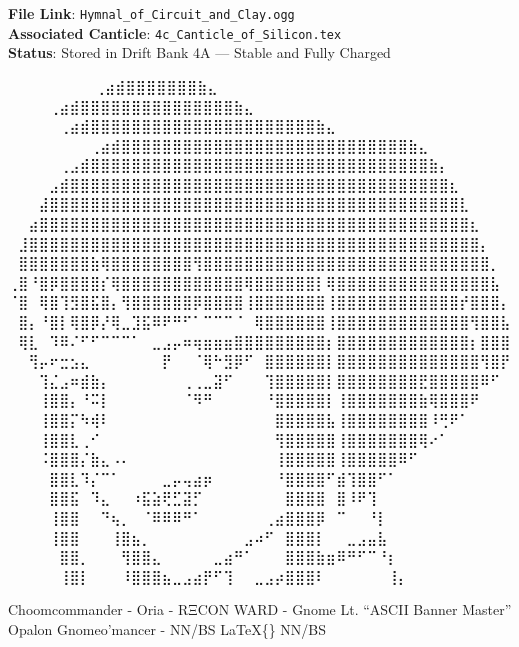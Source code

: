 \documentclass[
]{article}
\begin{document}
\textbf{File Link}: \texttt{Hymnal\_of\_Circuit\_and\_Clay.ogg}\\
\textbf{Associated Canticle}: \texttt{4c\_Canticle\_of\_Silicon.tex}\\
\textbf{Status}: Stored in Drift Bank 4A --- Stable and Fully Charged

⠀⠀⠀⠀⠀⠀ ⠀⠀⢀⣴⣾⣿⣿⣿⣿⣿⣿⣿⣷⣄⠀⠀⠀⠀⠀⠀⠀⠀ ⠀⠀⠀ ⠀ ⠀⠀⠀⠀⢀⣴⣾⣿⣿⣿⣿⣿⣿⣿⣿⣿⣿⣿⣿⣿⣿⣿⣷⣄⠀⠀⠀⠀⠀⠀⠀⠀ ⠀⠀
⠀ ⠀⠀⠀⠀⠀⢀⣴⣾⣿⣿⣿⣿⣿⣿⣿⣿⣿⣿⣿⣿⣿⣿⣿⣿⣿⣿⣿⣿⣿⣿⣷⣄⠀⠀⠀⠀⠀⠀⠀⠀
⠀⠀⠀⠀⠀⠀⠀⠀⢀⣴⣾⣿⣿⣿⣿⣿⣿⣿⣿⣿⣿⣿⣿⣿⣿⣿⣿⣿⣿⣿⣿⣿⣿⣿⣿⣿⣿⣿⣿⣷⣄⠀⠀⠀⠀⠀⠀⠀⠀
⠀⠀⠀⠀⠀⢀⣠⣾⣿⣿⣿⣿⣿⣿⣿⣿⣿⣿⣿⣿⣿⣿⣿⣿⣿⣿⣿⣿⣿⣿⣿⣿⣿⣿⣿⣿⣿⣿⣿⣿⣿⣷⡄⠀⠀⠀⠀⠀⠀
⠀⠀⠀⠀⣠⣾⣿⣿⣿⣿⣿⣿⣿⣿⣿⣿⣿⣿⣿⣿⣿⣿⣿⣿⣿⣿⣿⣿⣿⣿⣿⣿⣿⣿⣿⣿⣿⣿⣿⣿⣿⣿⣿⣆⠀⠀⠀⠀⠀
⠀⠀⠀⣼⣿⣿⣿⣿⣿⣿⣿⣿⣿⣿⣿⣿⣿⣿⣿⣿⣿⣿⣿⣿⣿⣿⣿⣿⣿⣿⣿⣿⣿⣿⣿⣿⣿⣿⣿⣿⣿⣿⣿⣿⣇⠀⠀⠀⠀
⠀⠀⣴⣿⣿⣿⣿⣿⣿⣿⣿⣿⣿⣿⣿⣿⣿⣿⣿⣿⣿⣿⣿⣿⣿⣿⣿⣿⣿⣿⣿⣿⣿⣿⣿⣿⣿⣿⣿⣿⣿⣿⣿⣿⣿⣆⠀⠀⠀
⠀⣸⣿⣿⣿⣿⣿⣿⣿⣿⣿⣿⣿⣿⣿⣿⣿⣿⣿⣿⣿⣿⣿⣿⣿⣿⣿⣿⣿⣿⣿⣿⣿⣿⣿⣿⣿⣿⣿⣿⣿⣿⣿⣿⣿⣿⡄⠀⠀
⠀⣿⣿⣿⣿⣿⣿⣿⣷⢿⣿⣿⣿⣿⣿⣿⣿⣿⢻⣿⣿⣿⣿⣿⣿⣿⣿⣿⣿⣿⣿⣿⣿⣿⣿⣿⣿⣿⣿⣿⣿⣿⣿⣿⣿⣿⣿⡀⠀
⢀⣿⠘⣿⡿⣿⣿⣿⣿⡎⢿⣿⣿⣿⣿⣿⣿⣿⣿⣿⣿⣿⣿⢿⣿⣿⣿⣿⣿⣿⡇⢿⣿⣿⣿⣿⣿⣿⣿⣿⣿⣿⣿⣿⣿⣿⣿⣧⠀
⠈⣿⠀⢿⣿⢹⣻⣿⣯⣿⡄⢻⣿⣿⣿⣿⣿⣿⡿⣿⣿⣿⣿⢸⣿⣿⣿⣿⣿⣿⣿⢸⣿⣿⣿⣿⣿⣿⣿⣿⣿⣿⣿⣿⡞⣿⣿⣿⡄
⠀⣿⡄⠘⣿⡇⢿⣿⡿⡜⢿⣀⣹⣯⠿⠟⠛⠋⠁⠉⠉⠉⠈⠀⢿⣿⣿⣿⣿⣿⣿⢸⣿⣿⣿⣿⣿⣿⣿⣿⣿⣿⣿⣿⣿⢻⣿⣿⣧
⠀⢿⣇⠀⠹⠿⠌⠋⠋⠉⠉⠉⠁⠀⣀⣠⡤⠶⢶⣶⣶⣶⣿⣿⣿⣿⣿⣿⣿⣿⣿⡆⣿⣿⣿⣿⣿⣿⣿⣿⣿⣿⣿⣿⣿⡆⣿⣿⣿
⠀⠀⢻⡤⠖⣒⣢⣄⠀⠀⠀⠀⠀⠀⠀⡟⠀⠀⠈⢿⠓⣻⡿⠋⠀⣿⣿⣿⣿⣿⣿⡇⣿⣿⣿⣿⣿⣿⣿⣿⣿⣿⣿⣿⣿⣿⢻⣿⡟
⠀⠀⠀⢹⣌⣠⠶⣾⣷⡄⠀⠀⠀⠀⠀⠀⠀⢀⢀⣀⣽⠋⠀⠀⠀⢹⣿⣿⣿⣿⣿⡇⣿⣿⣿⣿⣿⣿⣿⣿⣟⣿⣿⣿⣿⣿⠿⠋⠀
⠀⠀⠀⢸⣿⣿⡄⠘⠭⡇⠀⠀⠀⠀⠀⠀⠀⠈⠻⠛⠀⠀⠀⠀⠀⠘⣿⣿⣿⣿⣿⡇⢸⣿⣿⣿⣿⣿⣿⣿⣷⢿⣿⣿⣿⠟⠀⠀⠀
⠀⠀⠀⢸⣿⣿⡍⠳⢾⠇⠀⠀⠀⠀⠀⠀⠀⠀⠀⠀⠀⠀⠀⠀⠀⠀⣿⣿⣿⣿⣿⣧⢸⣿⣿⣿⣿⣿⣿⣿⣿⠸⢛⠟⠁⠀⠀⠀⠀
⠀⠀⠀⢸⣿⣿⣇⢀⠊⠀⠀⠀⠀⠀⠀⠀⠀⠀⠀⠀⠀⠀⠀⠀⠀⠀⢻⣿⣿⣿⣿⣿⢸⣿⣿⣿⣿⣿⣿⣿⢿⠔⠁⠀⠀⠀⠀⠀⠀
⠀⠀⠀⠨⣿⣿⣿⡌⣷⣄⠠⠄⠀⠀⠀⠀⠀⠀⠀⠀⠀⠀⠀⠀⠀⠀⢸⣿⣿⣿⣿⣿⢸⣿⣿⣿⣿⣿⠿⠋⠀⠀⠀⠀⠀⠀⠀⠀⠀
⠀⠀⠀⠀⣿⣿⣇⠹⡌⠉⠁⠀⠀⠀⠀⣀⡤⢤⣴⡶⠀⠀⠀⠀⠀⠀⠘⣿⣿⣿⣿⠋⣾⢹⣿⣿⠋⠁⠀⠀⠀⠀⠀⠀⠀⠀⠀⠀⠀
⠀⠀⠀⠀⣿⣿⣯⠀⠹⣄⠀⠀⠰⣯⣵⢟⣋⣽⡋⠀⠀⠀⠀⠀⠀⠀⠀⣿⣿⣿⣿⠀⣿⠸⠟⢹⠀⠀⠀⠀⠀⠀⠀⠀⠀⠀⠀⠀⠀
⠀⠀⠀⠀⢸⣿⣿⠀⠀⠙⢦⡀⠀⠈⠿⠿⠿⠛⠁⠀⠀⠀⠀⠀⠀⢀⣴⣿⣿⣿⡿⠀⠉⠀⠀⠘⡇⠀⠀⠀⠀⠀⠀⠀⠀⠀⠀⠀⠀
⠀⠀⠀⠀⢸⣿⣿⠀⠀⠀⢸⣿⣦⡀⠀⠀⠀⠀⠀⠀⠀⠀⠀⣠⠴⠋⠀⣿⣿⣿⡇⠀⠀⣀⣠⣤⣧⠀⠀⠀⠀⠀⠀⠀⠀⠀⠀⠀⠀
⠀⠀⠀⠀⠀⣿⣿⡀⠀⠀⠀⢻⣿⣿⣄⠀⠀⠀⠀⠀⣀⣴⠛⠁⠀⠀⠀⣿⣿⣿⣷⣶⠿⠛⠋⠉⠘⡆⠀⠀⠀⠀⠀⠀⠀⠀⠀⠀⠀
⠀⠀⠀⠀⠀⢸⣿⡇⠀⠀⠀⠸⣿⣿⣿⣦⣀⣠⣴⡟⠋⢹⠀⠀⣀⣠⡴⣿⣿⣿⠇⠀⠀⠀⠀⠀⠀⢸⡄⠀⠀⠀⠀⠀⠀⠀⠀⠀⠀

Choomcommander - Oria - RΞCON WARD - Gnome Lt. ``ASCII Banner Master''
Opalon Gnomeo'mancer - NN/BS LaTeX\{\} NN/BS
\end{document}
